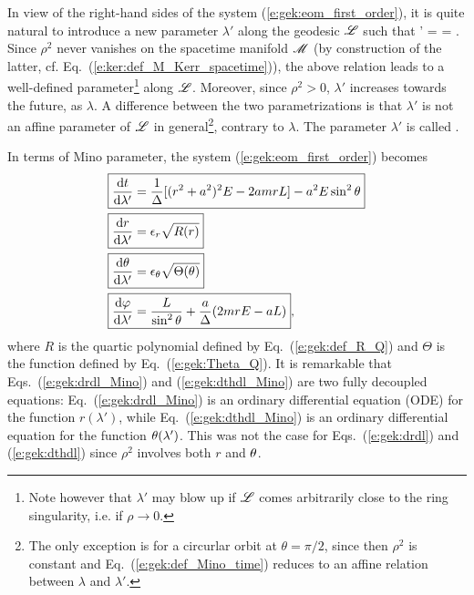 In view of the right-hand sides of the system (\ref{e:gek:eom_first_order}),
it is quite natural to introduce a new
parameter $\lambda'$
along the geodesic $\mathscr{L}$ such that
\be \label{e:gek:def_Mino_time}
    \D\lambda' = 
     =  .
\ee
Since $\rho^2$ never vanishes on the spacetime manifold $\mathscr{M}$ (by construction
of the latter, cf. Eq.~(\ref{e:ker:def_M_Kerr_spacetime})), the above relation
leads to a well-defined parameter\footnote{Note however that $\lambda'$ may blow up
if $\mathscr{L}$ comes arbitrarily close to the ring singularity, i.e. if $\rho\to 0$.} along $\mathscr{L}$.
Moreover, since $\rho^2>0$, $\lambda'$
increases towards the future, as $\lambda$. A difference between
the two parametrizations is that $\lambda'$ is not an affine parameter
of $\mathscr{L}$ in general\footnote{The only
exception is for a circurlar orbit at $\theta=\pi/2$, since then $\rho^2$
is constant and Eq.~(\ref{e:gek:def_Mino_time}) reduces to an affine relation
between $\lambda$ and $\lambda'$.}, contrary to $\lambda$.
The parameter $\lambda'$ is called  \cite{Mino03}.

In terms of Mino parameter, the system (\ref{e:gek:eom_first_order}) becomes
\begin{subequations}
\label{e:gek:eom_Mino}
\begin{align}
& \fbox{$\displaystyle  \frac{\mathrm{d} t}{\mathrm{d} \lambda'} = \frac{1}{\Delta} [(r^2 + a^2)^2 E - 2a m r L] - a^2 E \sin^2\theta $} \label{e:gek:dtdl_Mino} \\
& \fbox{$\displaystyle  \frac{\mathrm{d} r}{\mathrm{d} \lambda'} = \epsilon_r \sqrt{ R(r) } $} \label{e:gek:drdl_Mino}\\
& \fbox{$\displaystyle  \frac{\mathrm{d} \theta}{\mathrm{d} \lambda'} = \epsilon_\theta \sqrt{\Theta(\theta)} $} \label{e:gek:dthdl_Mino}\\
& \fbox{$\displaystyle  \frac{\mathrm{d} \varphi}{\mathrm{d} \lambda'}  = \frac{L}{\sin^2\theta}
    + \frac{a}{\Delta}(2 m r E - a L) $} , \label{e:gek:dphdl_Mino}
\end{align}
\end{subequations}
where $R$ is the quartic polynomial defined by Eq.~(\ref{e:gek:def_R_Q})
and $\Theta$ is the function defined by Eq.~(\ref{e:gek:Theta_Q}).
It is remarkable that Eqs.~(\ref{e:gek:drdl_Mino}) and (\ref{e:gek:dthdl_Mino})
are two fully decoupled equations: Eq.~(\ref{e:gek:drdl_Mino}) is an ordinary
differential equation (ODE) for the function $r(\lambda')$, while Eq.~(\ref{e:gek:dthdl_Mino})
is an ordinary differential equation for the function $\theta(\lambda')$. This was
not the case for Eqs.~(\ref{e:gek:drdl}) and (\ref{e:gek:dthdl}) since $\rho^2$ involves
both $r$ and $\theta$.

